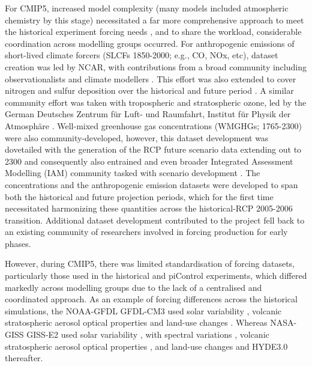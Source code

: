\documentclass[manuscript]{copernicus}
\begin{document}
For CMIP5, increased model complexity (many models included atmospheric chemistry by this stage) necessitated a far more comprehensive approach to meet the historical experiment forcing needs \citep[1850-2005;][]{taylor_overview_2012}, and to share the workload, considerable coordination across modelling groups occurred. For anthropogenic emissions of short-lived climate forcers (SLCFs 1850-2000; e.g., CO, NOx, etc), dataset creation was led by NCAR, with contributions from a broad community including observationalists and climate modellers \citep{lamarque_historical_2010}. This effort was also extended to cover nitrogen and sulfur deposition over the historical and future period \citep[e.g.,][]{lamarque_multi-model_2013}. A similar community effort was taken with tropospheric and stratospheric ozone, led by the German Deutsches Zentrum f{\"u}r Luft- und Raumfahrt, Institut f{\"u}r Physik der Atmosph{\"a}re \citep[DLR;][]{cionni_ozone_2011}. Well-mixed greenhouse gas concentrations (WMGHGs; 1765-2300) were also community-developed, however, this dataset development was dovetailed with the generation of the RCP future scenario data extending out to 2300 and consequently also entrained and even broader Integrated Assessment Modelling (IAM) community tasked with scenario development \citep{meinshausen_rcp_2011}. The concentrations and the anthropogenic emission datasets were developed to span both the historical and future projection periods, which for the first time necessitated harmonizing these quantities across the historical-RCP 2005-2006 transition. Additional dataset development contributed to the project fell back to an existing community of researchers involved in forcing production for early phases.

However, during CMIP5, there was limited standardisation of forcing datasets, particularly those used in the historical and piControl experiments, which differed markedly across modelling groups due to the lack of a centralised and coordinated approach. As an example of forcing differences across the historical simulations, the NOAA-GFDL GFDL-CM3 \citep{donner_dynamical_2011} used solar variability \citep{frohlich_solar_2004}, volcanic stratospheric aerosol optical properties \citep{stenchikov_arctic_2006} and land-use changes \citep{hurtt_underpinnings_2006}. Whereas NASA-GISS GISS-E2 \citep{miller_cmip5_2014} used solar variability \citep{wang_modeling_2005}, with spectral variations \citep[][updated 2009]{lean_new_2003}, volcanic stratospheric aerosol optical properties \citep[][updated]{sato_stratospheric_1993}, and land-use changes \citep[1850-1900;][]{pongratz_reconstruction_2008} and HYDE3.0 \citep[e.g.,][]{klein_goldewijk_hyde_2011} thereafter.
\end{document}
